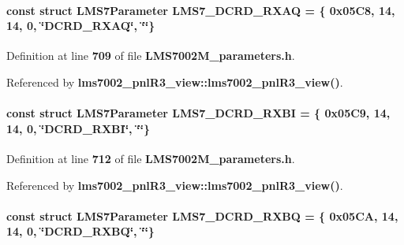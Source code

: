 \paragraph[{L\+M\+S7\+\_\+\+D\+C\+R\+D\+\_\+\+R\+X\+AQ}]{\setlength{\rightskip}{0pt plus 5cm}const struct {\bf L\+M\+S7\+Parameter} L\+M\+S7\+\_\+\+D\+C\+R\+D\+\_\+\+R\+X\+AQ = \{ 0x05\+C8, 14, 14, 0, \char`\"{}\+D\+C\+R\+D\+\_\+\+R\+X\+A\+Q\char`\"{}, \char`\"{}\char`\"{}\}\hspace{0.3cm}{\ttfamily [static]}}\label{LMS7002M__parameters_8h_a35ac4b2fd8ceffcd4471c90509803a3e}


Definition at line {\bf 709} of file {\bf L\+M\+S7002\+M\+\_\+parameters.\+h}.



Referenced by {\bf lms7002\+\_\+pnl\+R3\+\_\+view\+::lms7002\+\_\+pnl\+R3\+\_\+view()}.

\paragraph[{L\+M\+S7\+\_\+\+D\+C\+R\+D\+\_\+\+R\+X\+BI}]{\setlength{\rightskip}{0pt plus 5cm}const struct {\bf L\+M\+S7\+Parameter} L\+M\+S7\+\_\+\+D\+C\+R\+D\+\_\+\+R\+X\+BI = \{ 0x05\+C9, 14, 14, 0, \char`\"{}\+D\+C\+R\+D\+\_\+\+R\+X\+B\+I\char`\"{}, \char`\"{}\char`\"{}\}\hspace{0.3cm}{\ttfamily [static]}}\label{LMS7002M__parameters_8h_a53292ad3c46d0c37c6bfd1ac3c68f26a}


Definition at line {\bf 712} of file {\bf L\+M\+S7002\+M\+\_\+parameters.\+h}.



Referenced by {\bf lms7002\+\_\+pnl\+R3\+\_\+view\+::lms7002\+\_\+pnl\+R3\+\_\+view()}.

\paragraph[{L\+M\+S7\+\_\+\+D\+C\+R\+D\+\_\+\+R\+X\+BQ}]{\setlength{\rightskip}{0pt plus 5cm}const struct {\bf L\+M\+S7\+Parameter} L\+M\+S7\+\_\+\+D\+C\+R\+D\+\_\+\+R\+X\+BQ = \{ 0x05\+C\+A, 14, 14, 0, \char`\"{}\+D\+C\+R\+D\+\_\+\+R\+X\+B\+Q\char`\"{}, \char`\"{}\char`\"{}\}\hspace{0.3cm}{\ttfamily [static]}}\label{LMS7002M__parameters_8h_a7256b4ffda8e56e20d1cdd370455d42d}


